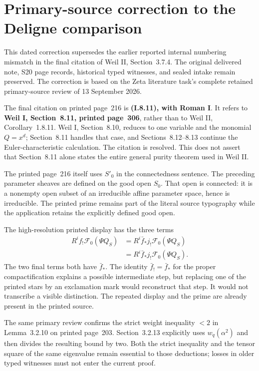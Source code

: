 \documentclass{article}
\begin{document}
\maketitle
\section{Primary-source correction to the Deligne comparison}
\label{sec:deligne-primary-source-correction}

This dated correction supersedes the earlier reported internal numbering
mismatch in the final citation of Weil II, Section~3.7.4. The original
delivered note, S20 page records, historical typed witnesses, and sealed
intake remain preserved. The correction is based on the Zeta literature
task's complete retained primary-source review of 13 September 2026.

The final citation on printed page~216 is \textbf{(I.8.11), with Roman I}.
It refers to \textbf{Weil I, Section~8.11, printed page~306}, rather than
to Weil II, Corollary~1.8.11. Weil I, Section~8.10, reduces to one variable
and the monomial $Q=x^d$; Section~8.11 handles that case, and
Sections~8.12--8.13 continue the Euler-characteristic calculation.
The citation is resolved. This does not assert that Section~8.11 alone
states the entire general purity theorem used in Weil II.

The printed page~216 itself uses $S'_0$ in the connectedness sentence.
The preceding parameter sheaves are defined on the good open $S_0$.
That open is connected: it is a nonempty open subset of an irreducible
affine parameter space, hence is irreducible. The printed prime remains
part of the literal source typography while the application retains
the explicitly defined good open.

The high-resolution printed display has the three terms
\[
\begin{aligned}
 R^if_!\mathcal F_0(\Psi Q_S)
 &=R^i\bar f_*j_!\mathcal F_0(\Psi Q_S)\\
 &=R^i\bar f_*j_!\mathcal F_0(\Psi Q_S).
\end{aligned}
\]
The two final terms both have $\bar f_*$. The identity
$\bar f_!=\bar f_*$ for the proper compactification explains a
possible intermediate step, but replacing one of the printed stars
by an exclamation mark would reconstruct that step. It would not
transcribe a visible distinction. The repeated display and the prime
are already present in the printed source.

The same primary review confirms the strict weight inequality $<2$
in Lemma~3.2.10 on printed page~203. Section~3.2.13 explicitly uses
$w_q(\alpha^2)$ and then divides the resulting bound by two.
Both the strict inequality and the tensor square of the same
eigenvalue remain essential to those deductions; losses in older
typed witnesses must not enter the current proof.
\end{document}
